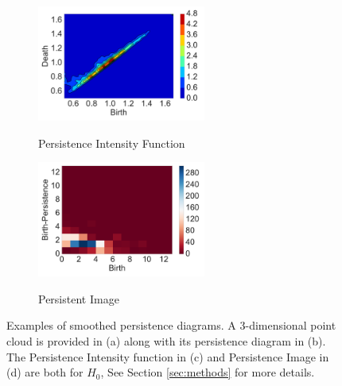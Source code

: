 \documentclass[12pt]{article}
\begin{document}
\begin{figure}[htbp]
    \begin{subfigure}{.48\textwidth}
    \centering
        \caption{Persistence Intensity Function}
        \includegraphics[height = 1.5in]{figure_5_kernel.pdf}
    \label{fig:examplestest5}
  \end{subfigure}
    \begin{subfigure}{.48\textwidth}
    \centering
        \caption{Persistent Image}
        \includegraphics[height = 1.5in]{figure_5_pimage_fun.pdf}
    \label{fig:examplestest8}
  \end{subfigure}
   \caption{Examples of smoothed persistence diagrams.  A 3-dimensional point cloud is provided in (a) along with its persistence diagram in (b).  
The Persistence Intensity function in (c) and Persistence Image in (d) are both for $H_0$, 
See Section \ref{sec:methods} for more details.}
   \label{fig:examples}
\end{figure}
\end{document}
